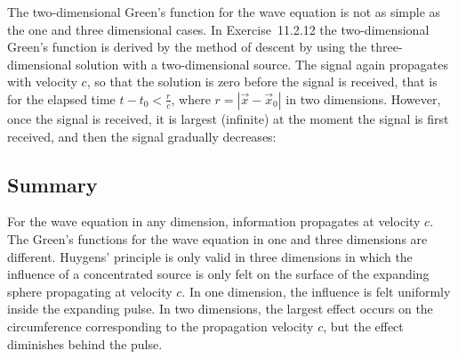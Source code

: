 The two-dimensional Green's function for the wave equation is not as simple as the one and three dimensional cases.  In Exercise~11.2.12 the two-dimensional Green's function is derived by the method of descent by using the three-dimensional solution with a two-dimensional source.  The signal again propagates with velocity $c$, so that the solution is zero before the signal is received, that is for the elapsed time $t - t_0 < \frac{r}{c}$, where $r = |\vec{x} - \vec{x}_0|$ in two dimensions.  However, once the signal is received, it is largest (infinite) at the moment the signal is first received, and then the signal gradually decreases:

\subsection{Summary}
\label{subsec:wave-green-summary}

For the wave equation in any dimension, information propagates at velocity $c$.  The Green's functions for the wave equation in one and three dimensions are different.  Huygens' principle is only valid in three dimensions in which the influence of a concentrated source is only felt on the surface of the expanding sphere propagating at velocity $c$.  In one dimension, the influence is felt uniformly inside the expanding pulse.  In two dimensions, the largest effect occurs on the circumference corresponding to the propagation velocity $c$, but the effect diminishes behind the pulse.


